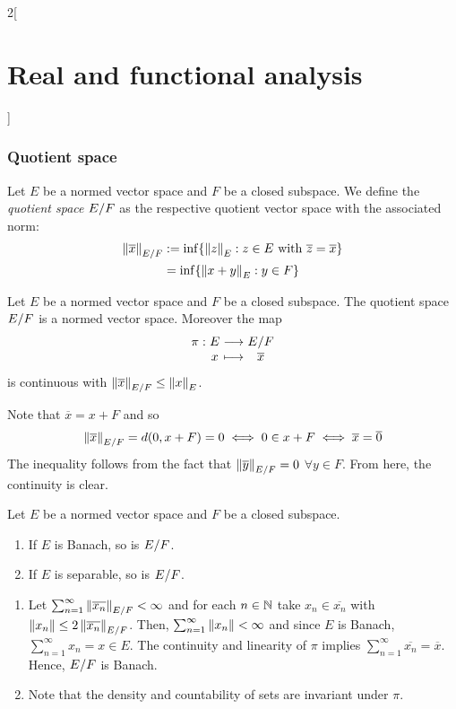 \documentclass[../../../main_math.tex]{subfiles}
\begin{document}
\begin{multicols}{2}[\section{Real and functional analysis}]
  \subsubsection{Quotient space}
  \begin{definition}
    Let $E$ be a normed vector space and $F$ be a closed subspace. We define the \emph{quotient space} $\quot{E}{F}$ as the respective quotient vector space with the associated norm:
    \begin{align*}
      \norm{\overline{x}}_{\quot{E}{F}} & :=\inf\{\norm{z}_E:z\in E\text{ with }\overline{z} = \overline{x}\} \\
                                        & =\inf\{\norm{x+y}_E:y\in F\}
    \end{align*}
  \end{definition}
  \begin{proposition}
    Let $E$ be a normed vector space and $F$ be a closed subspace. The quotient space $\quot{E}{F}$ is a normed vector space. Moreover the map $$\function{\pi}{E}{\quot{E}{F}}{x}{\overline{x}}$$ is continuous with $\norm{\overline{x}}_{\quot{E}{F}}\leq \norm{x}_E$.
  \end{proposition}
  \begin{sproof}
    Note that $\overline{x}=x+F$ and so $$\norm{\overline{x}}_{\quot{E}{F}}=d(0,x+F)=0\iff 0\in x+ F\iff \overline{x}=\overline{0}$$
    The inequality follows from the fact that $\norm{\overline{y}}_{\quot{E}{F}}=0$ $\forall y\in F$. From here, the continuity is clear.
  \end{sproof}
  \begin{lemma}
    Let $E$ be a normed vector space and $F$ be a closed subspace.
    \begin{enumerate}
      \item If $E$ is Banach, so is $\quot{E}{F}$.
      \item If $E$ is separable, so is $\quot{E}{F}$.
    \end{enumerate}
  \end{lemma}
  \begin{sproof}
    \begin{enumerate}
      \item Let $\sum_{n=1}^\infty\norm{\overline{x_n}}_{\quot{E}{F}}<\infty$ and for each $n\in\mathbb{N}$ take $x_n\in\overline{x_n}$ with $\norm{x_n}\leq 2\norm{\overline{x_n}}_{\quot{E}{F}}$. Then, $\sum_{n=1}^\infty\left\|x_n\right\|<\infty$ and since $E$ is Banach, $\sum_{n=1}^\infty x_n=x\in E$. The continuity and linearity of $\pi$ implies $\sum_{n=1}^\infty \overline{x_n}=\overline{x}$. Hence, $\quot{E}{F}$ is Banach.
      \item Note that the density and countability of sets are invariant under $\pi$.
    \end{enumerate}
  \end{sproof}

\end{multicols}
\end{document}
